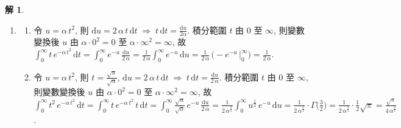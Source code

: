 \documentclass[12pt]{extarticle}
\newcommand{\ds}{\displaystyle}
\newcommand{\ie}{\;\Longrightarrow\;}
\theoremstyle{definition}
\newtheorem*{sol}{解}
\begin{document}
\begin{sol}
\begin{enumerate}
      \begin{enumerate}\setlength{\itemsep}{0pt}
        \item $\ds\Gamma\Big(\frac{1}{2}\Big)=\int_{0}^{\infty} t^{-\frac{1}{2}} e^{-t}\,\text{d}t = \int_{0}^{\infty}\frac{e^{-t}}{\sqrt{t}}\,\text{d}t$. 令 $\ds u = \sqrt{t}$, 則 $\ds t = u^2$, $\ds\text{d}u = \frac{1}{2\sqrt{t}}\,\text{d}t \ie \frac{1}{\sqrt{t}}\,\text{d}t = 2\,\text{d}u$. 積分範圍 $t$ 由 $0$ 至 $\infty$, 則變數變換後 $u$ 由 $\ds\sqrt{0} = 0$ 至 $\ds\sqrt{\infty} = \infty$, 故 $\ds\Gamma\Big(\frac{1}{2}\Big) = \int_{0}^{\infty}\!\frac{e^{-t}}{\sqrt{t}}\,\text{d}t = 2\int_0^\infty\!\!e^{-u^2}\,\text{d}u = 2\cdot\frac{\sqrt{\pi}}{2} = \sqrt{\pi}$. 
        \item 由 $\ds\Gamma(x + 1) = x\,\Gamma(x)$, $\ds\Gamma\Big(\frac{3}{2}\Big) = \Gamma\Big(\frac{1}{2} + 1\Big) = \frac{1}{2}\,\Gamma\Big(\frac{1}{2}\Big) = \frac{1}{2}\,\sqrt{\pi}$. 
      \end{enumerate}
    \item
      \begin{enumerate}\setlength{\itemsep}{0pt}
        \item 令 $\ds u = \alpha\,t^2$, 則 $\ds\text{d}u = 2\,\alpha\,t\,\text{d}t \ie t\,\text{d}t = \frac{\text{d}u}{2\alpha}$. 積分範圍 $t$ 由 $0$ 至 $\infty$, 則變數變換後 $u$ 由 $\ds\alpha\cdot0^2 = 0$ 至 $\ds\alpha\cdot\infty^2 = \infty$, 故 $\ds\int_0^\infty t\,e^{-\alpha\,t^2}\,\text{d}t = \int_0^\infty\!e^{-u}\,\frac{\text{d}u}{2\,\alpha} = \frac{1}{2\,\alpha}\int_0^\infty\!e^{-u}\,\text{d}u = \frac{1}{2\,\alpha}\,\Big(-e^{-u}\,\Big|_0^\infty\Big) = \frac{1}{2\,\alpha}$. 
        \item 令 $\ds u = \alpha\,t^2$, 則 $\ds t = \frac{\sqrt{u}}{\sqrt{\alpha}}$, $\ds\text{d}u = 2\,\alpha\,t\,\text{d}t \ie t\,\text{d}t = \frac{\text{d}u}{2\,\alpha}$. 積分範圍 $t$ 由 $0$ 至 $\infty$, 則變數變換後 $u$ 由 $\ds\alpha\cdot0^2 = 0$ 至 $\ds\alpha\cdot\infty^2 = \infty$, 故 $\ds\int_0^\infty\!t^2\,e^{-\alpha\,t^2}\,\text{d}t = \int_0^\infty\!t\,e^{-\alpha\,t^2}\,t\,\text{d}t = \int_0^\infty\!\frac{\sqrt{u}}{\sqrt{\alpha}}\,e^{-u}\,\frac{\text{d}u}{2\,\alpha} = \frac{1}{2\,\alpha^{\frac{3}{2}}}\int_0^\infty\!u^{\frac{1}{2}}\,e^{-u}\,\text{d}u = \frac{1}{2\,\alpha^{\frac{3}{2}}}\cdot\Gamma\Big(\frac{3}{2}\Big) = \frac{1}{2\,\alpha^{\frac{3}{2}}}\cdot\frac{1}{2}\sqrt{\pi} = \frac{\sqrt{\pi}}{4\,\alpha^{\frac{3}{2}}}$. 
      \end{enumerate}
  \end{enumerate}
\end{sol}
\end{document}
